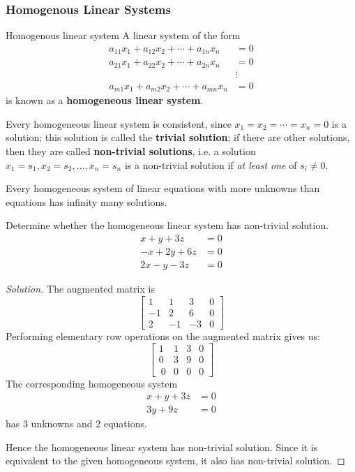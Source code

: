 \subsubsection{Homogenous Linear Systems}
\begin{defn}{Homogenous linear system}{}
A linear system of the form
\[ \begin{split}
a_{11}x_1 + a_{12}x_2 + \cdots + a_{1n}x_n &= 0 \\
a_{21}x_1 + a_{22}x_2 + \cdots + a_{2n}x_n &= 0 \\
&\vdots \\
a_{m1}x_1 + a_{m2}x_2 + \cdots + a_{mn}x_n &= 0
\end{split} \]
is known as a \textbf{homogeneous linear system}.
\end{defn}

Every homogeneous linear system is consistent, since $x_1=x_2=\cdots=x_n=0$ is a solution; this solution is called the \textbf{trivial solution}; if there are other solutions, then they are called \textbf{non-trivial solutions}, i.e. a solution $x_1=s_1, x_2=s_2, \dots, x_n=s_n$ is a non-trivial solution if \emph{at least one} of $s_i \neq 0$.

\begin{thrm}{}{}
Every homogeneous system of linear equations with more unknowns than equations has infinity many solutions.
\end{thrm}

\begin{exmp}{}{}
Determine whether the homogeneous linear system has non-trivial solution.
\begin{align*}
x + y + 3z &= 0 \\
-x + 2y + 6z &= 0 \\
2x - y - 3z &= 0
\end{align*}
\end{exmp}

\begin{proof}[Solution]
The augmented matrix is 
\[ \begin{bmatrix}
    1 & 1 & 3 & 0 \\
    -1 & 2 & 6 & 0 \\
    2 & -1 & -3 & 0
\end{bmatrix} \]
Performing elementary row operations on the augmented matrix gives us:
\[ \begin{bmatrix}
    1 & 1 & 3 & 0 \\
    0 & 3 & 9 & 0 \\\
    0 & 0 & 0 & 0
\end{bmatrix} \]
The corresponding homogeneous system
\begin{align*}
x + y + 3z &= 0 \\
3y + 9z &= 0
\end{align*}
has 3 unknowns and 2 equations.

Hence the homogeneous linear system has non-trivial solution. Since it is equivalent to the given homogeneous system, it also has non-trivial solution.
\end{proof}

